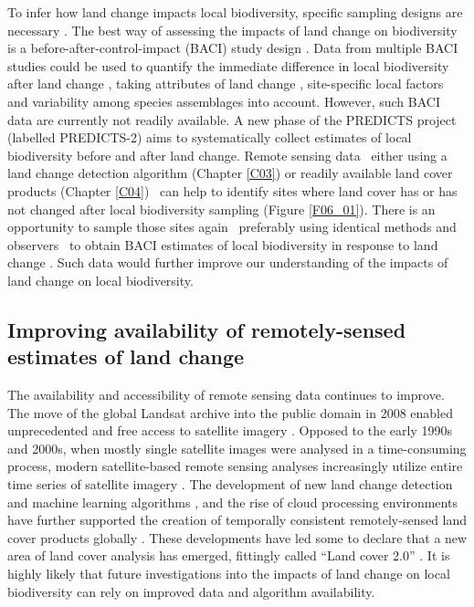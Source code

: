 To infer how land change impacts local biodiversity, specific sampling designs are necessary \citep{DePalma2018}. The best way of assessing the impacts of land change on biodiversity is a before-after-control-impact (BACI) study design \citep{Cardinale2018,DePalma2018}. Data from multiple BACI studies could be used to quantify the immediate difference in local biodiversity after land change \citep{Ratajczak2018}, taking attributes of land change \citep{Watson2014}, site-specific local factors \citep{Jung2016} and variability among species assemblages \citep{Dornelas2013,Franca2016} into account. However, such BACI data are currently not readily available. A new phase of the PREDICTS project (labelled PREDICTS-2) aims to systematically collect estimates of local biodiversity before and after land change. Remote sensing data \textendash\ either using a land change detection algorithm (Chapter \ref{C03}) or readily available land cover products (Chapter \ref{C04}) \textendash\ can help to identify sites where land cover has or has not changed after local biodiversity sampling (Figure \ref{F06_01}). There is an opportunity to sample those sites again \textendash\ preferably using identical methods and observers \textendash\ to obtain BACI estimates of local biodiversity in response to land change \citep{DePalma2018}. Such data would further improve our understanding of the impacts of land change on local biodiversity.

\subsection{Improving availability of remotely-sensed estimates of land change}
\label{C06_0404}

The availability and accessibility of remote sensing data continues to improve. The move of the global Landsat archive into the public domain in 2008 enabled unprecedented and free access to satellite imagery \citep{Wulder2015}. Opposed to the early 1990s and 2000s, when mostly single satellite images were analysed in a time-consuming process, modern satellite-based remote sensing analyses increasingly utilize entire time series of satellite imagery \citep{Kennedy2014,Hermosilla2015a}. The development of new land change detection \citep{Coppin2004,Abercrombie2016,Zhu2017} and machine learning algorithms \citep{Maxwell2018}, and the rise of cloud processing environments \citep{Gorelick2017} have further supported the creation of temporally consistent remotely-sensed land cover products globally \citep{ESA2017,Hermosilla2018,Sulla-Menashe2019}. These developments have led some to declare that a new area of land cover analysis has emerged, fittingly called “Land cover 2.0” \citep{Wulder2018}. It is highly likely that future investigations into the impacts of land change on local biodiversity can rely on improved data and algorithm availability.


